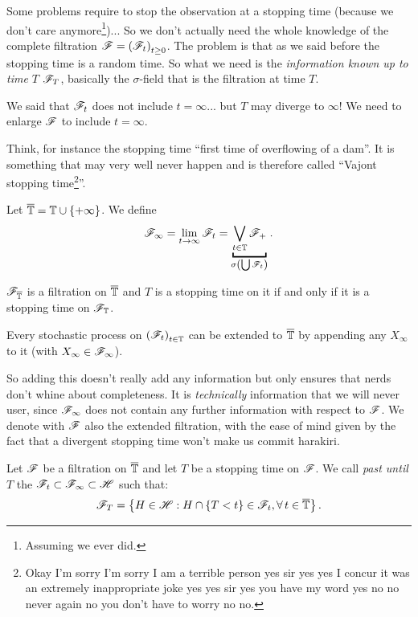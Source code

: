 \documentclass{report}
\begin{document}
Some problems require to stop the observation at a stopping time (because we don't care anymore\footnote{Assuming we ever did.})... So we don't actually need the whole knowledge of the complete filtration $\mathscr{F}={\left(\mathscr{F}_t\right)}_{t\geq 0}$. The problem is that as we said before the stopping time is a random time. So what we need is the \textit{information known up to time $T$} $\mathscr{F}_T$, basically the $\sigma$-field that is the filtration at time $T$. 
\begin{remark}
	We said that $\mathscr{F}_t$ does not include $t=\infty$... but $T$ may diverge to $\infty$! We need to enlarge $\mathscr{F}$ to include $t=\infty$.
\end{remark}
Think, for instance the stopping time ``first time of overflowing of a dam''. It is something that may very well never happen and is therefore called ``Vajont stopping time\footnote{Okay I'm sorry I'm sorry I am a terrible person yes sir yes yes I concur it was an extremely inappropriate joke yes yes sir yes you have my word yes no no never again no you don't have to worry no no.}''.
\begin{definition}
	Let $\overline{\mathbb{T}}=\mathbb{T}\cup\left\{+\infty\right\}$. We define
	\[\F_\infty=\lim_{t\to\infty}\F_t=\underbracket{\bigvee_{t\in\T}\F_+}_{\sigma\left(\bigcup\F_t\right)}.\]
\end{definition}
\begin{definition}
	$\mathscr{F}_{\overline{\mathbb{T}}}$ is a filtration on $\overline{\mathbb{T}}$ and $T$ is a stopping time on it if and only if it is a stopping time on $\mathscr{F}_{\mathbb{T}}$.
\end{definition}
\begin{remark}
	Every stochastic process on ${(\mathscr{F}_{t})}_{t\in\mathbb{T}}$ can be extended to $\overline{\mathbb{T}}$ by appending any \rv{} $X_\infty$ to it (with $X_\infty\in\mathscr{F}_{\infty}$).
\end{remark}
So adding this \rv{} doesn't really add any information but only ensures that nerds don't whine about completeness. It is \textit{technically} information that we will never user, since $\mathscr{F}_\infty$ does not contain any further information with respect to $\mathscr{F}$. We denote with $\mathscr{F}$ also the extended filtration, with the ease of mind given by the fact that a divergent stopping time won't make us commit harakiri.
\begin{definition}
	Let $\mathscr{F}$ be a filtration on $\overline{\mathbb{T}}$ and let $T$ be a stopping time on $\mathscr{F}$. We call \emph{past until $T$} the \sa{} $\mathscr{F}_t\subset\mathscr{F}_\infty\subset\mathscr{H}$ such that:
	\[\mathscr{F}_T=\left\{H\in\mathscr{H}:H\cap\{T<t\}\in\mathscr{F}_t,\forall\, t\in\overline{\mathbb{T}}\right\}.\]
\end{definition}
\end{document}
